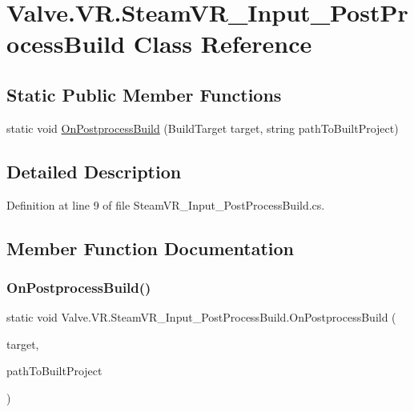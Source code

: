 \hypertarget{class_valve_1_1_v_r_1_1_steam_v_r___input___post_process_build}{}\section{Valve.\+V\+R.\+Steam\+V\+R\+\_\+\+Input\+\_\+\+Post\+Process\+Build Class Reference}
\label{class_valve_1_1_v_r_1_1_steam_v_r___input___post_process_build}
\subsection*{Static Public Member Functions}
\begin{DoxyCompactItemize}
\item 
static void \mbox{\hyperlink{class_valve_1_1_v_r_1_1_steam_v_r___input___post_process_build_a5b3043aa6529dce089b0bd8e9f067d07}{On\+Postprocess\+Build}} (Build\+Target target, string path\+To\+Built\+Project)
\end{DoxyCompactItemize}


\subsection{Detailed Description}


Definition at line 9 of file Steam\+V\+R\+\_\+\+Input\+\_\+\+Post\+Process\+Build.\+cs.



\subsection{Member Function Documentation}
\mbox{\label{class_valve_1_1_v_r_1_1_steam_v_r___input___post_process_build_a5b3043aa6529dce089b0bd8e9f067d07}} 
\subsubsection{\texorpdfstring{OnPostprocessBuild()}{OnPostprocessBuild()}}
{\footnotesize\ttfamily static void Valve.\+V\+R.\+Steam\+V\+R\+\_\+\+Input\+\_\+\+Post\+Process\+Build.\+On\+Postprocess\+Build (\begin{DoxyParamCaption}\item[{Build\+Target}]{target,  }\item[{string}]{path\+To\+Built\+Project }\end{DoxyParamCaption})\hspace{0.3cm}{\ttfamily [static]}}



